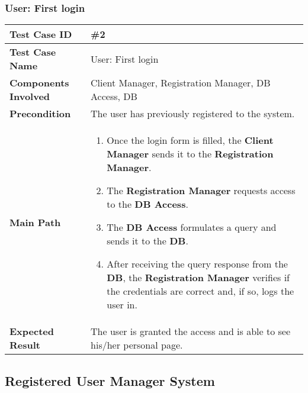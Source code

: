 \subsubsection{User: First login}
\begin{center}
	\begin{tabular} { | m{4.5cm} | m{8.5cm} | }
		\hline
		\textbf{Test Case ID} & \#2\\
		\hline
		\textbf{Test Case Name} & User: First login\\
		\hline
		\textbf{Components Involved} & Client Manager, Registration Manager, DB Access, DB\\
		\hline
		\textbf{Precondition} & The user has previously registered to the system.\\
		\hline
		\textbf{Main Path} & 
		\begin{enumerate}
			\item Once the login form is filled, the \textbf{Client Manager} sends it to the \textbf{Registration Manager}.
			\item The \textbf{Registration Manager} requests access to the \textbf{DB Access}.
			\item The \textbf{DB Access} formulates a query and sends it to the \textbf{DB}.
			\item After receiving the query response from the \textbf{DB}, the \textbf{Registration Manager} verifies if the credentials are correct and, if so, logs the user in.
		\end{enumerate}\\
		\hline
		\textbf{Expected Result} & The user is granted the access and is able to see his/her personal page.\\
		\hline
	\end{tabular}
\end{center}
\newpage
\subsection{Registered User Manager System}
